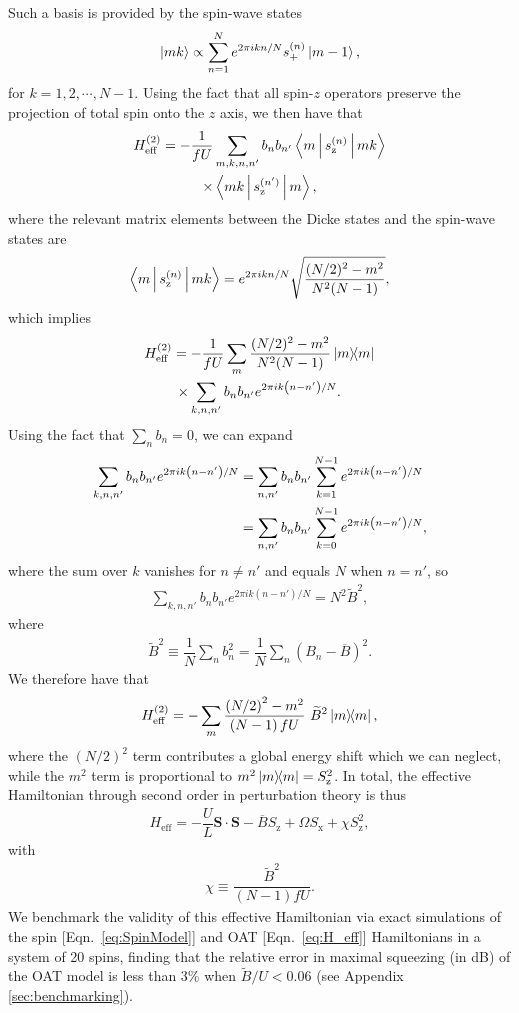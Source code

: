\documentclass[aps,prx,superscriptaddress,notitlepage,twocolumn,longbibliography]{revtex4-2}
\renewcommand{\t}{\text} %
\newcommand{\f}[2]{\dfrac{#1}{#2}} %
\newcommand{\p}[1]{\left(#1\right)} %
\renewcommand{\c}{\cdot} %
\renewcommand{\v}{\bm} %
\newcommand{\bk}{\Braket}
\renewcommand{\ket}{\Ket}
\newcommand{\z}{\text{z}}
\newcommand{\x}{\text{x}}
\begin{document}
Such a basis is provided by the spin-wave states
\begin{align}
  \ket{mk}
  \propto
  \sum_{n=1}^N e^{2\pi ikn/N} s_+^{(n)} \ket{m-1},
\end{align}
for $k=1,2,\cdots,N-1$\cite{swallows2011suppression}.
Using the fact that all spin-$z$ operators preserve the projection of total spin onto the $z$ axis, we then have that
\begin{multline}
  H_{\t{eff}}^{(2)}
  = -\f1{fU} \sum_{m,k,n,n'} b_n b_{n'}
  \bk{m | s_\z^{(n)} |mk} \\
  \times \bk{mk | s_\z^{(n')} | m},
  \label{eq:general_H_eff_2}
\end{multline}
where the relevant matrix elements between the Dicke states and the spin-wave states are\cite{swallows2011suppression}
\begin{align}
  \bk{m|s_\z^{(n)}|mk}
  = e^{2\pi i k n/N} \sqrt{\f{(N/2)^2-m^2}{N^2 (N-1)}},
\end{align}
which implies
\begin{multline}
  H_{\t{eff}}^{(2)}
  = -\f1{fU} \sum_m \f{(N/2)^2-m^2}{N^2 (N-1)} \op{m} \\
  \times \sum_{k,n,n'} b_n b_{n'} e^{2\pi ik\p{n-n'}/N}.
\end{multline}
Using the fact that $\sum_nb_n=0$, we can expand
\begin{align}
  \sum_{k,n,n'} b_n b_{n'} e^{2\pi ik\p{n-n'}/N}
  &= \sum_{n,n'} b_n b_{n'} \sum_{k=1}^{N-1} e^{2\pi ik\p{n-n'}/N} \notag \\
  &= \sum_{n,n'} b_n b_{n'} \sum_{k=0}^{N-1} e^{2\pi ik\p{n-n'}/N},
\end{align}
where the sum over $k$ vanishes for $n\ne n'$ and equals $N$ when $n=n'$, so
\begin{align}
  \sum_{k,n,n'} b_n b_{n'} e^{2\pi ik\p{n-n'}/N}
  = N^2 \widetilde B^2,
\end{align}
where
\begin{align}
  \widetilde B^2
  \equiv \f1N \sum_n b_n^2 = \f1N \sum_n \p{B_n - \overline B}^2.
  \label{eq:sum_knn}
\end{align}
We therefore have that
\begin{align}
  H_{\t{eff}}^{(2)}
  = -\sum_m \f{\p{N/2}^2-m^2}{\p{N-1}fU}~ \widetilde B^2 \op{m},
\end{align}
where the $\p{N/2}^2$ term contributes a global energy shift which we can neglect, while the $m^2$ term is proportional to $m^2\op{m}=S_\z^2$.
In total, the effective Hamiltonian through second order in perturbation theory is thus
\begin{align}
  H_{\t{eff}}
  = -\f{U}{L}\v S\c\v S - \overline B S_\z + \Omega S_\x + \chi S_\z^2,
\label{eq:H_OAT}
\end{align}
with
\begin{align}
  \chi \equiv \f{\widetilde B^2}{\p{N-1}fU}.
\end{align}
We benchmark the validity of this effective Hamiltonian via exact simulations of the spin [Eqn.~\eqref{eq:SpinModel}] and OAT [Eqn.~\eqref{eq:H_eff}] Hamiltonians in a system of 20 spins, finding that the relative error in maximal squeezing (in dB) of the OAT model is less than 3\% when $\widetilde{B}/U<0.06$ (see Appendix \ref{sec:benchmarking}).
\end{document}
